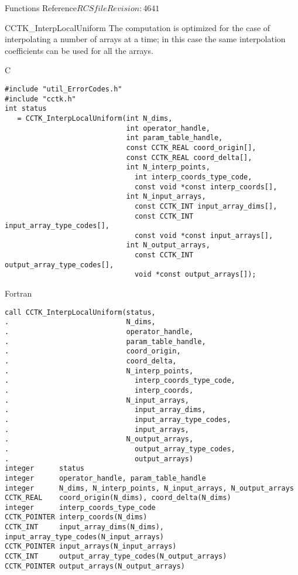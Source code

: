\begin{cactuspart}{ Functions Reference}{$RCSfile$}{$Revision: 4641 $}
\begin{FunctionDescription}{CCTK\_InterpLocalUniform}
The computation is optimized for the case of interpolating a
number of arrays at a time; in this case the same interpolation
coefficients can be used for all the arrays.

\begin{SynopsisSection}
\begin{Synopsis}{C}
\begin{verbatim}
#include "util_ErrorCodes.h"
#include "cctk.h"
int status
   = CCTK_InterpLocalUniform(int N_dims,
                             int operator_handle,
                             int param_table_handle,
                             const CCTK_REAL coord_origin[],
                             const CCTK_REAL coord_delta[],
                             int N_interp_points,
                               int interp_coords_type_code,
                               const void *const interp_coords[],
                             int N_input_arrays,
                               const CCTK_INT input_array_dims[],
                               const CCTK_INT input_array_type_codes[],
                               const void *const input_arrays[],
                             int N_output_arrays,
                               const CCTK_INT output_array_type_codes[],
                               void *const output_arrays[]);
\end{verbatim}
\end{Synopsis}
\begin{Synopsis}{Fortran}
\begin{verbatim}
call CCTK_InterpLocalUniform(status,
.                            N_dims,
.                            operator_handle,
.                            param_table_handle,
.                            coord_origin,
.                            coord_delta,
.                            N_interp_points,
.                              interp_coords_type_code,
.                              interp_coords,
.                            N_input_arrays,
.                              input_array_dims,
.                              input_array_type_codes,
.                              input_arrays,
.                            N_output_arrays,
.                              output_array_type_codes,
.                              output_arrays)
integer      status
integer      operator_handle, param_table_handle
integer      N_dims, N_interp_points, N_input_arrays, N_output_arrays
CCTK_REAL    coord_origin(N_dims), coord_delta(N_dims)
integer      interp_coords_type_code
CCTK_POINTER interp_coords(N_dims)
CCTK_INT     input_array_dims(N_dims), input_array_type_codes(N_input_arrays)
CCTK_POINTER input_arrays(N_input_arrays)
CCTK_INT     output_array_type_codes(N_output_arrays)
CCTK_POINTER output_arrays(N_output_arrays)
\end{verbatim}
\end{Synopsis}
\end{SynopsisSection}


\end{FunctionDescription}
\end{cactuspart}
